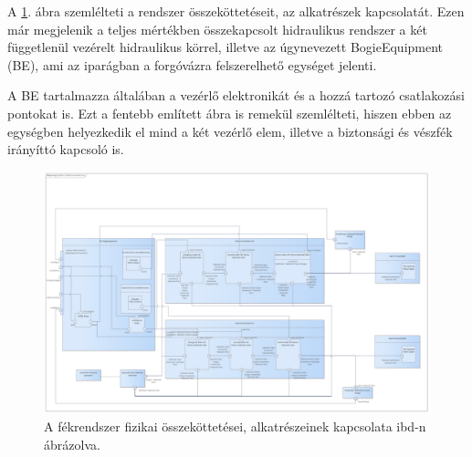 A \ref{fig:plat_ibd}. ábra szemlélteti a rendszer összeköttetéseit, az alkatrészek kapcsolatát.
Ezen már megjelenik a teljes mértékben összekapcsolt hidraulikus rendszer a két függetlenül vezérelt hidraulikus körrel, illetve az úgynevezett BogieEquipment (BE), ami az iparágban a forgóvázra felszerelhető egységet jelenti.

A BE tartalmazza általában a vezérlő elektronikát és a hozzá tartozó csatlakozási pontokat is.
Ezt a fentebb említett ábra is remekül szemlélteti, hiszen ebben az egységben helyezkedik el mind a két vezérlő elem, illetve a biztonsági és vészfék irányíttó kapcsoló is.

\begin{figure}
    \footnotesize
    \centering
    \includegraphics[width=150mm,keepaspectratio]{figures/Platform_Architecture_ibd.png}
    \caption{A fékrendszer fizikai összeköttetései, alkatrészeinek kapcsolata ibd-n ábrázolva.}
    \label{fig:plat_ibd}
\end{figure}